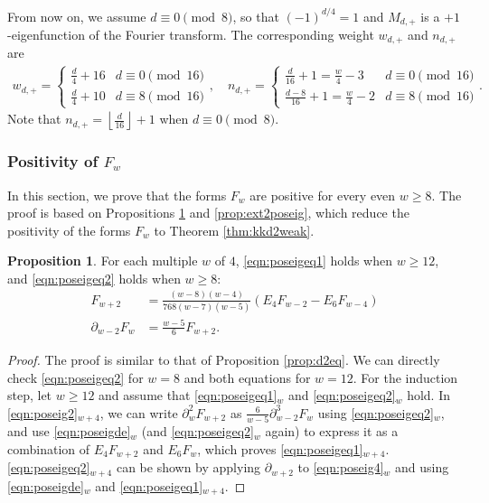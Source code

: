 \documentclass[10pt,reqno]{amsproc}
\newcommand{\1}{\mathds{1}}	%
\theoremstyle{definition}
\newtheorem{proposition}[theorem]{Proposition}
\theoremstyle{remark}
\begin{document}
From now on, we assume $d \equiv 0 \pmod{8}$, so that $(-1)^{d/4} = 1$ and $M_{d,+}$ is a $+1$-eigenfunction of the Fourier transform.
The corresponding weight $w_{d,+}$ and $n_{d,+}$ are
\begin{align}
    w_{d,+} = \begin{cases}
        \frac{d}{4} + 16 & d \equiv 0 \pmod{16} \\ \frac{d}{4} + 10 & d \equiv 8 \pmod{16}
    \end{cases}, \quad n_{d,+} = \begin{cases}
        \frac{d}{16} + 1 = \frac{w}{4} - 3 & d \equiv 0 \pmod{16} \\ \frac{d-8}{16} + 1 = \frac{w}{4} - 2  & d \equiv 8 \pmod{16}
    \end{cases}.
\end{align}
Note that $n_{d,+} = \left\lfloor \frac{d}{16} \right\rfloor + 1$ when $d \equiv 0 \pmod{8}$.


\subsubsection{Positivity of $F_w$}
\label{subsec:posFw}

In this section, we prove that the forms $F_w$ are positive for every even $w \geq 8$.
The proof is based on Propositions \ref{prop:serrederposeig} and \ref{prop:ext2poseig}, which reduce the positivity of the forms $F_w$ to Theorem \ref{thm:kkd2weak}.
\begin{proposition}
\label{prop:serrederposeig}
For each multiple $w$ of $4$, \eqref{eqn:poseigeq1} holds when $w \geq 12$, and \eqref{eqn:poseigeq2} holds when $w \geq 8$:
\begin{align}
F_{w+2} &= \frac{(w-8)(w-4)}{768(w-7)(w-5)} (E_4 F_{w - 2} - E_6 F_{w - 4})   \label{eqn:poseigeq1} \\
\partial_{w - 2} F_{w} &= \frac{w - 5}{6} F_{w + 2}. \label{eqn:poseigeq2}
\end{align}
\end{proposition}
\begin{proof}
The proof is similar to that of Proposition \ref{prop:d2eq}.
We can directly check \eqref{eqn:poseigeq2} for $w = 8$ and both equations for $w = 12$.
For the induction step, let $w \geq 12$ and assume that \eqref{eqn:poseigeq1}${}_{w}$ and \eqref{eqn:poseigeq2}${}_{w}$ hold.
In \eqref{eqn:poseig2}${}_{w+4}$, we can write $\partial_{w}^{2}F_{w+2}$ as $\frac{6}{w-5}\partial_{w-2}^{3}F_{w}$ using \eqref{eqn:poseigeq2}${}_{w}$, and use \eqref{eqn:poseigde}${}_{w}$ (and \eqref{eqn:poseigeq2}${}_{w}$ again) to express it as a combination of $E_4 F_{w+2}$ and $E_6 F_{w}$, which proves \eqref{eqn:poseigeq1}${}_{w+4}$.
\eqref{eqn:poseigeq2}${}_{w+4}$ can be shown by applying $\partial_{w+2}$ to \eqref{eqn:poseig4}${}_{w}$ and using \eqref{eqn:poseigde}${}_{w}$ and \eqref{eqn:poseigeq1}${}_{w+4}$.
\end{proof}
\end{document}
